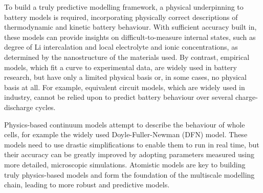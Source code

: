 \documentclass[../main.tex]{subfiles}
\begin{document}
To build a truly predictive modelling framework, a physical underpinning to battery models is required, incorporating physically correct descriptions of thermodynamic and kinetic battery behaviour. With sufficient accuracy built in, these models can provide insights on difficult-to-measure internal states, such as degree of Li intercalation and local electrolyte and ionic concentrations, as determined by the nanostructure of the materials used. By contrast, empirical models, which fit a curve to experimental data, are widely used in battery research, but have only a limited physical basis or, in some cases, no physical basis at all. For example, equivalent circuit models, which are widely used in industry, cannot be relied upon to predict battery behaviour over several charge-discharge cycles.

Physics-based continuum models attempt to describe the behaviour of whole cells, for example the widely used Doyle-Fuller-Newman (DFN) model. \cite{doyle1993modeling, fuller1994simulation, Fuller1994a,Doyle1995,Newman2004} These models need to use drastic simplifications to enable them to run in real time, but their accuracy can be greatly improved by adopting parameters measured using more detailed, microscopic simulations. Atomistic models are key to building truly physics-based models and form the foundation of the multiscale modelling chain, leading to more robust and predictive models.
 
\end{document}
